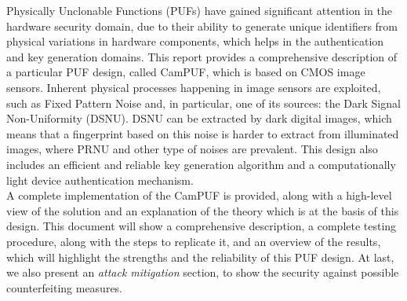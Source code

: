 Physically Unclonable Functions (PUFs) have gained significant attention in the hardware security domain, due to their ability to generate unique identifiers
from physical variations in hardware components, which helps in the authentication and key generation domains. This report provides a comprehensive description
of a particular PUF design, called CamPUF, which is based on CMOS image sensors.
Inherent physical processes happening in image sensors are exploited, such as Fixed Pattern Noise and, in particular, one of its sources: the Dark Signal Non-Uniformity (DSNU).
DSNU can be extracted by dark digital images, which means that a fingerprint based on this noise is harder to extract from illuminated images, where PRNU and other type of noises are prevalent.
This design also includes an efficient and reliable key generation algorithm and a computationally light device authentication mechanism.
\\
A complete implementation of the CamPUF is provided, along with a high-level view of the solution and an explanation of the theory which is at the basis of this design.
This document will show a comprehensive description, a complete testing procedure, along with the steps to replicate it, and an overview of the results, which
will highlight the strengths and the reliability of this PUF design. At last, we also present an \textit{attack mitigation} section, to show the security against
possible counterfeiting measures.





